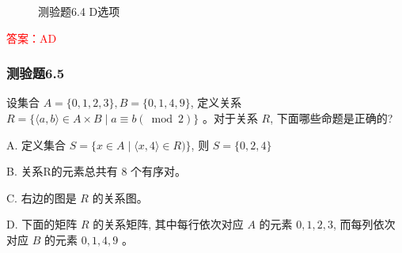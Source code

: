 \documentclass[UTF8, heading=true]{ctexart}
\begin{document}
\begin{figure}[htbp]
\begin{minipage}[t]{0.3\textwidth}
	      \vspace{-0.5cm}
        \caption{测验题6.4 D选项}
\end{minipage}
\end{figure}

\textcolor{red}{答案：AD}

\subsubsection{测验题6.5}

设集合 $A=\{0,1,2,3\}, B=\{0,1,4,9\}$, 定义关系 $R=\{\langle a, b\rangle \in A \times B \mid a \equiv b(\bmod 2)\}$ 。对于关系 $R$, 下面哪些命题是正确的?

A. 定义集合 $S=\{x \in A \mid\langle x, 4\rangle \in R)\}$, 则 $S=\{0,2,4\}$

B. 关系R的元素总共有 8 个有序对。

C. 右边的图是 $R$ 的关系图。

D. 下面的矩阵 $R$ 的关系矩阵, 其中每行依次对应 $A$ 的元素 $0,1,2,3$, 而每列依次对应 $B$ 的元素 $0,1,4,9$ 。
\end{document}
